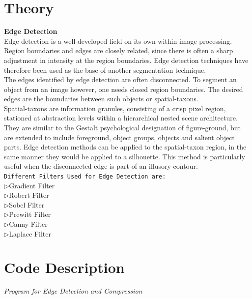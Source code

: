 \documentclass[12pt]{article}
\begin{document}
\section{Theory}
\textbf{Edge Detection}\\
 Edge detection is a well-developed field on its own within image processing. Region boundaries and edges are closely related, since there is often a sharp adjustment in intensity at the region boundaries. Edge detection techniques have therefore been used as the base of another segmentation technique.\\

The edges identified by edge detection are often disconnected. To segment an object from an image however, one needs closed region boundaries. The desired edges are the boundaries between such objects or spatial-taxons.\\

Spatial-taxons are information granules, consisting of a crisp pixel region, stationed at abstraction levels within a hierarchical nested scene architecture. They are similar to the Gestalt psychological designation of figure-ground, but are extended to include foreground, object groups, objects and salient object parts. Edge detection methods can be applied to the spatial-taxon region, in the same manner they would be applied to a silhouette. This method is particularly useful when the disconnected edge is part of an illusory contour.\\

\texttt{Different Filters Used for Edge Detection are:}\\
$\rhd$\quad Gradient Filter\\
$\rhd$\quad Robert Filter\\
$\rhd$\quad Sobel Filter\\
$\rhd$\quad Prewitt Filter\\
$\rhd$\quad Canny Filter\\
$\rhd$\quad Laplace Filter\\

\pagebreak
\section{Code Description}
\emph{Program for Edge Detection and Compression }

\pagebreak
\end{document}
